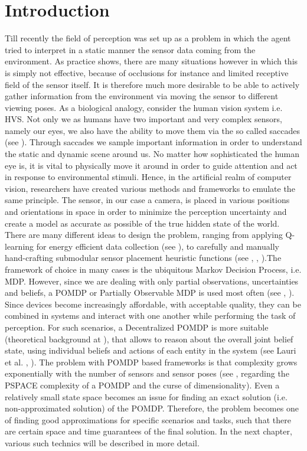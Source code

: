 \documentclass[a4paper,11pt,english]{article}
\begin{document}
\section{Introduction}
\label{sec:introduction}
Till recently the field of perception was set up as a problem in which the agent tried to interpret in a static manner the sensor data coming from the environment. As practice shows, there are many situations however in which this is simply not effective, because of occlusions for instance and limited receptive field of the sensor itself. It is therefore much more desirable to be able to actively gather information from the environment via moving the sensor to different viewing poses. As a biological analogy, consider the human vision system i.e. HVS. Not only we as humans have two important and very complex sensors, namely our eyes, we also have the ability to move them via the so called saccades (see \cite{rolfs2015attention}). Through saccades we sample important information in order to understand the static and dynamic scene around us. No matter how sophisticated the human eye is, it is vital to physically move it around in order to guide attention and act in response to environmental stimuli.
Hence, in the artificial realm of computer vision, researchers have created various methods and frameworks to emulate the same principle. The sensor, in our case a camera, is placed in various positions and orientations in space in order to minimize the perception uncertainty and create a model as accurate as possible of the true hidden state of the world. There are many different ideas to design the problem, ranging from applying Q-learning for energy efficient data collection (see \cite{di2010adaptive}), to carefully and manually hand-crafting submodular sensor placement heuristic functions (see \cite{nemhauser1978analysis}, \cite{feige1998threshold}, \cite{golovin2011adaptive}).The framework of choice in many cases is the ubiquitous Markov Decision Process, i.e. MDP. However, since we are dealing with only partial observations, uncertainties and beliefs, a POMDP or Partially Observable MDP is used most often (see \cite{eidenberger2010active}, \cite{sridharan2010planning}). Since devices become increasingly affordable, with acceptable quality, they can be combined in systems and interact with one another while performing the task of perception. For such scenarios, a Decentralized POMDP is more suitable (theoretical background at \cite{oliehoek2016concise}), that allows to reason about the overall joint belief state, using individual beliefs and actions of each entity in the system (see Lauri et al. \cite{lauri2017multi}, \cite{lauri2019information}). The problem with POMDP based frameworks is that complexity grows exponentially with the number of sensors and sensor poses (see \cite{papadimitriou1987complexity}, \cite{shani2006prioritizing} regarding the PSPACE complexity of a POMDP and the curse of dimensionality). Even a relatively small state space becomes an issue for finding an exact solution (i.e. non-approximated solution) of the POMDP. Therefore, the problem becomes one of finding good approximations for specific scenarios and tasks, such that there are certain space and time guarantees of the final solution. In the next chapter, various such technics will be described in more detail.
\end{document}
